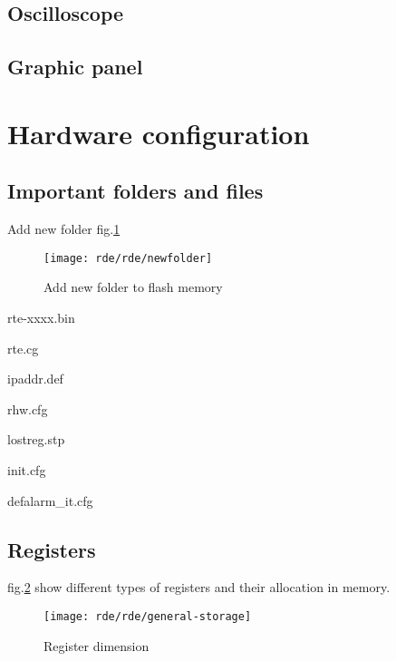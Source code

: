 %	
\subsection{Oscilloscope}


%	
\subsection{Graphic panel}


%	 
\section{Hardware configuration}

%	
\subsection{Important folders and files}
Add new folder fig.\ref{fig:newfolder}

\begin{figure}[h]
	\centering\texttt{[image: rde/rde/newfolder]}
	\caption{Add new folder to flash memory}
	\label{fig:newfolder}
\end{figure}

rte-xxxx.bin

rte.cg

ipaddr.def

rhw.cfg

lostreg.stp

init.cfg

defalarm\_it.cfg

%	
\subsection{Registers}

fig.\ref{fig:general-storage} show different types of registers and their allocation in memory.

\begin{figure}[h]
	\centering\texttt{[image: rde/rde/general-storage]}
	\caption{Register dimension}
	\label{fig:general-storage}
\end{figure}


